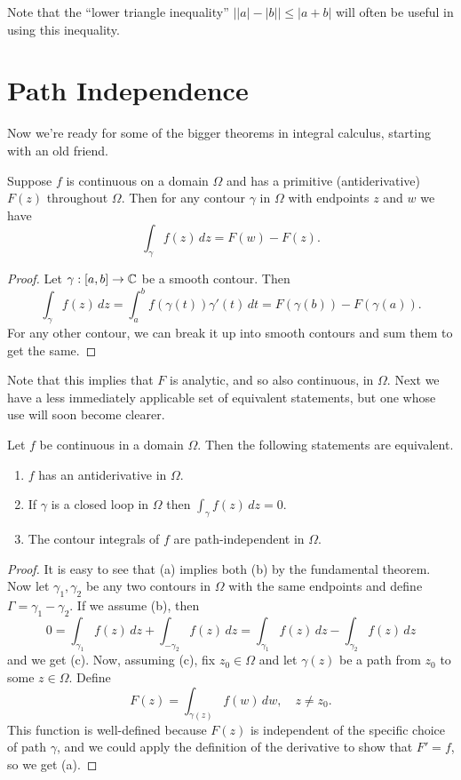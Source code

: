 \documentclass[../m136main.tex]{subfiles}
\begin{document}
Note that the ``lower triangle inequality'' $\big| |a| - |b| \big| \leq |a + b|$ will often be useful in using this inequality.

\section{Path Independence}
Now we're ready for some of the bigger theorems in integral calculus, starting with an old friend.

\begin{theorem}
    Suppose $f$ is continuous on a domain $\Omega$ and has a primitive (antiderivative) $F(z)$ throughout $\Omega$.
    Then for any contour $\gamma$ in $\Omega$ with endpoints $z$ and $w$ we have
    \[ \int_\gamma f(z) \,dz = F(w) - F(z). \]
\end{theorem}

\begin{proof}
    Let $\gamma : [a,b] \to \mathbb{C}$ be a smooth contour.
    Then
    \[ \int_\gamma f(z) \,dz = \int_a^b f(\gamma(t)) \gamma'(t) \,dt = F(\gamma(b)) - F(\gamma(a)). \]
    For any other contour, we can break it up into smooth contours and sum them to get the same.
\end{proof}

Note that this implies that $F$ is analytic, and so also continuous, in $\Omega$.
Next we have a less immediately applicable set of equivalent statements, but one whose use will soon become clearer.

\begin{theorem}
    Let $f$ be continuous in a domain $\Omega$.
    Then the following statements are equivalent.
    \begin{enumerate}[label=(\alph*),topsep=0pt]
        \item $f$ has an antiderivative in $\Omega$.
        \item If $\gamma$ is a closed loop in $\Omega$ then $\int_\gamma f(z) \,dz = 0$.
        \item The contour integrals of $f$ are path-independent in $\Omega$.
    \end{enumerate}
\end{theorem}

\begin{proof}
    It is easy to see that (a) implies both (b) by the fundamental theorem.
    Now let $\gamma_1, \gamma_2$ be any two contours in $\Omega$ with the same endpoints and define $\Gamma = \gamma_1 - \gamma_2$.
    If we assume (b), then
    \[ 0 = \int_{\gamma_1} f(z) \,dz + \int_{-\gamma_2} f(z) \,dz = \int_{\gamma_1} f(z) \,dz - \int_{\gamma_2} f(z) \,dz \]
    and we get (c).
    Now, assuming (c), fix $z_0 \in \Omega$ and let $\gamma(z)$ be a path from $z_0$ to some $z \in \Omega$.
    Define
    \[ F(z) = \int_{\gamma(z)} f(w) \,dw, \quad z \neq z_0. \]
    This function is well-defined because $F(z)$ is independent of the specific choice of path $\gamma$, and we could apply the definition of the derivative to show that $F' = f$, so we get (a).
\end{proof}
\end{document}

